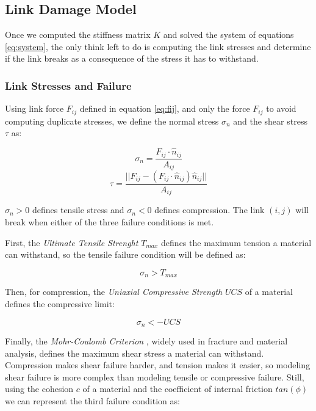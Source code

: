 \subsection{Link Damage Model}
Once we computed the stiffness matrix $K$ and solved the system of equations 
\ref{eq:system}, the only think left to do is computing the link 
stresses and determine if the link breaks as a consequence of the stress
it has to withstand. 

\subsubsection{Link Stresses and Failure}
 Using link force $F_{ij}$ 
defined in equation \ref{eq:fij}, and only the force $F_{ij}$ to avoid 
computing duplicate stresses, we define the normal stress $\sigma_n$ and 
the shear stress $\tau$ as:

\begin{equation}\label{eq:normal_stress}
    \sigma_n = \frac{F_{ij} \cdot \hat{n}_{ij}}{A_{ij}}
\end{equation}
\begin{equation}\label{eq:shear_stress}
    \tau =  \frac{||F_{ij} - (F_{ij} \cdot \hat{n}_{ij})\hat{n}_{ij}||}{A_{ij}}
\end{equation}

$\sigma_n > 0$ defines tensile stress and $\sigma_n < 0$ defines compression. The 
link $(i,j)$ will break when either of the three failure conditions is met.
\vspace{10pt}

First, the \textit{Ultimate Tensile Strenght} $T_{max}$ defines the maximum tension
a material can withstand, so the tensile failure condition will be defined as:

\begin{equation}
    \sigma_n > T_{max}
\end{equation}

Then, for compression, the \textit{Uniaxial Compressive Strength} $UCS$ of a material
defines the compressive limit:

\begin{equation}
    \sigma_n < -UCS
\end{equation}

Finally, the \textit{Mohr-Coulomb Criterion} \cite{labuz2014mohr}, widely used in fracture 
and material analysis, defines the maximum shear 
stress a material can withstand. Compression makes shear failure harder, 
and tension makes it easier, so modeling shear failure is more complex 
than modeling tensile or compressive failure. Still, using the cohesion 
$c$ of a material and the coefficient of internal friction $tan(\phi)$ we can 
represent the third failure condition as:

